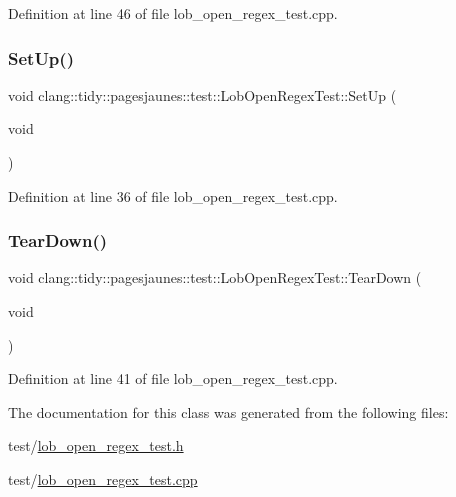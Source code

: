 Definition at line 46 of file lob\+\_\+open\+\_\+regex\+\_\+test.\+cpp.

\mbox{\label{classclang_1_1tidy_1_1pagesjaunes_1_1test_1_1_lob_open_regex_test_a28160c083fe738f04e533a3cb7d671e6}} 
\subsubsection{\texorpdfstring{Set\+Up()}{SetUp()}}
{\footnotesize\ttfamily void clang\+::tidy\+::pagesjaunes\+::test\+::\+Lob\+Open\+Regex\+Test\+::\+Set\+Up (\begin{DoxyParamCaption}\item[{void}]{ }\end{DoxyParamCaption})\hspace{0.3cm}{\ttfamily [virtual]}}



Definition at line 36 of file lob\+\_\+open\+\_\+regex\+\_\+test.\+cpp.

\mbox{\label{classclang_1_1tidy_1_1pagesjaunes_1_1test_1_1_lob_open_regex_test_a931d786126fbeba5785ac94925c37ffc}} 
\subsubsection{\texorpdfstring{Tear\+Down()}{TearDown()}}
{\footnotesize\ttfamily void clang\+::tidy\+::pagesjaunes\+::test\+::\+Lob\+Open\+Regex\+Test\+::\+Tear\+Down (\begin{DoxyParamCaption}\item[{void}]{ }\end{DoxyParamCaption})\hspace{0.3cm}{\ttfamily [virtual]}}



Definition at line 41 of file lob\+\_\+open\+\_\+regex\+\_\+test.\+cpp.



The documentation for this class was generated from the following files\+:\begin{DoxyCompactItemize}
\item 
test/\hyperlink{lob__open__regex__test_8h}{lob\+\_\+open\+\_\+regex\+\_\+test.\+h}\item 
test/\hyperlink{lob__open__regex__test_8cpp}{lob\+\_\+open\+\_\+regex\+\_\+test.\+cpp}\end{DoxyCompactItemize}

